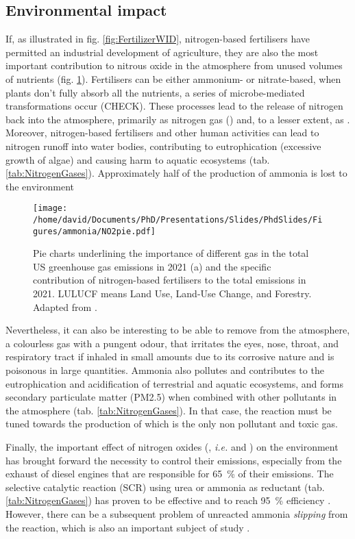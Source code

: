 \subsection{Environmental impact}

If, as illustrated in fig. \ref{fig:FertilizerWID}, nitrogen-based fertilisers have permitted an industrial development of agriculture, they are also the most important contribution to nitrous oxide in the atmosphere from unused volumes of nutrients (fig. \ref{fig:PieGreenhouseNO2}).
Fertilisers can be either ammonium- or nitrate-based, when plants don't fully absorb all the nutrients, a series of microbe-mediated transformations occur (CHECK).
These processes lead to the release of nitrogen back into the atmosphere, primarily as nitrogen gas (\nitrogen) and, to a lesser extent, as \nitrousoxide.
Moreover, nitrogen-based fertilisers and other human activities can lead to nitrogen runoff into water bodies, contributing to eutrophication (excessive growth of algae) and causing harm to aquatic ecosystems (tab. \ref{tab:NitrogenGases}).
Approximately half of the production of ammonia is lost to the environment \parencite{ERISMAN2007}

\begin{figure}[!htb]
    \centering
    \texttt{[image: /home/david/Documents/PhD/Presentations/Slides/PhdSlides/Figures/ammonia/NO2pie.pdf]}
    \caption{
    Pie charts underlining the importance of different gas in the total US greenhouse gas emissions in 2021 (a) and the specific contribution of nitrogen-based fertilisers to the total \nitrousoxide emissions in 2021.
    LULUCF means Land Use, Land-Use Change, and Forestry.
    Adapted from \cite{EPAGreenhouseGases}.
    }
    \label{fig:PieGreenhouseNO2}
\end{figure}

Nevertheless, it can also be interesting to be able to remove \ammonia from the atmosphere, a colourless gas with a pungent odour, that irritates the eyes, nose, throat, and respiratory tract if inhaled in small amounts due to its corrosive nature and is poisonous in large quantities.
Ammonia also pollutes and contributes to the eutrophication and acidification of terrestrial and aquatic ecosystems, and forms secondary particulate matter (PM2.5) when combined with other pollutants in the atmosphere (tab. \ref{tab:NitrogenGases}).
In that case, the reaction must be tuned towards the production of \nitrogen which is the only non pollutant and toxic gas.

Finally, the important effect of nitrogen oxides (, \textit{i.e.} \nitricoxide and \nitrogendioxide) on the environment has brought forward the necessity to control their emissions, especially from the exhaust of diesel engines that are responsible for \qty{65}{\percent} of their emissions.
The selective catalytic reaction (SCR) using urea or ammonia as reductant (tab. \ref{tab:NitrogenGases}) has proven to be effective and to reach \qty{95}{\percent} efficiency \parencite{MitsubishiSCR}.
However, there can be a subsequent problem of unreacted ammonia \textit{slipping} from the reaction, which is also an important subject of study \parencite{Thermofischer}.

